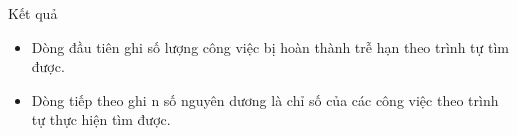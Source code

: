 Kết quả  
\begin{itemize}
	\item     Dòng đầu tiên ghi số lượng công việc bị hoàn thành trễ hạn theo trình tự tìm được.   
	\item     Dòng tiếp theo ghi n số nguyên dương là chỉ số của các công việc theo trình tự thực hiện tìm được.   
\end{itemize}